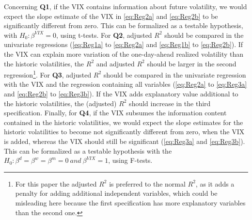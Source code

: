 Concerning \textbf{Q1}, if the \ac{VIX} contains information about future volatility, we would expect the slope estimate of the VIX in \ref{eq:Reg2a} and \ref{eq:Reg2b} to be significantly different from zero. This can be formalized as a testable hypothesis, with $H_{0}: \beta^{VIX} = 0$, using t-tests. For \textbf{Q2}, adjusted $R^{2}$ should be compared in the univariate regressions (\ref{eq:Reg1a} to \ref{eq:Reg2a} and \ref{eq:Reg1b} to \ref{eq:Reg2b}). If the \ac{VIX} can explain more variation of the one-day-ahead realized volatility than the historic volatilities, the $R^{2}$ and adjusted $R^{2}$ should be larger in the second regression\footnote{For this paper the adjusted $R^{2}$ is preferred to the normal $R^{2}$, as it adds a penalty for adding additional independent variables, which could be misleading here because the first specification has more explanatory variables than the second one.}. For \textbf{Q3}, adjusted $R^{2}$ should be compared in the univariate regression with the VIX and the regression containing all variables (\ref{eq:Reg2a} to \ref{eq:Reg3a} and \ref{eq:Reg2b} to \ref{eq:Reg3b}). If the \ac{VIX} adds explanatory value additional to the historic volatilities, the (adjusted) $R^{2}$ should increase in the third specification. Finally, for \textbf{Q4}, if the VIX subsumes the information content contained in the historic volatilities, we would expect the slope estimates for the historic volatilities to become not significantly different from zero, when the VIX is added, whereas the VIX should still be significant (\ref{eq:Reg3a} and \ref{eq:Reg3b}). This can be formalized as a testable hypothesis with the $H_{0}: \beta^{d} = \beta^{w} = \beta^{m} = 0 \ and \ \beta^{VIX} = 1$, using F-tests.

\newpage
